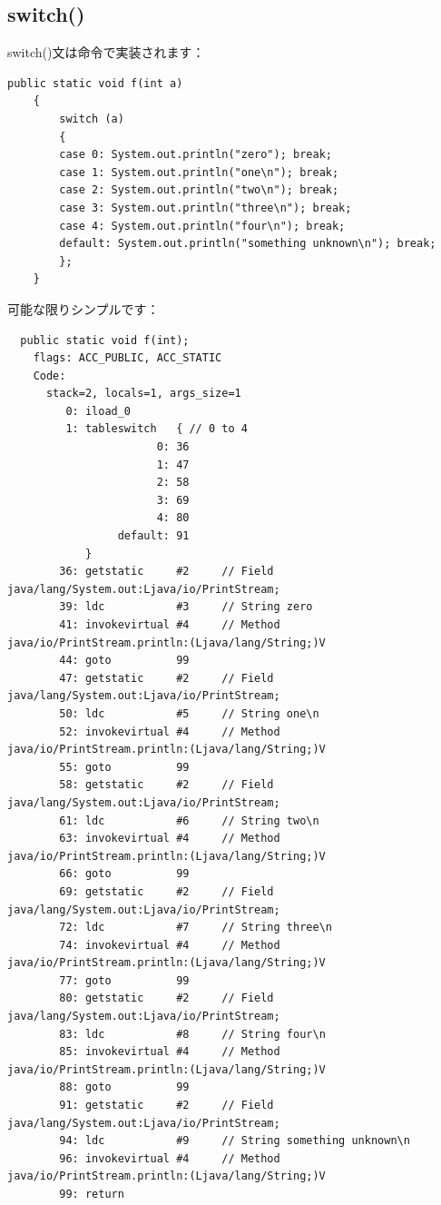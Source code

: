 \subsection{switch()}

switch()文は命令で実装されます：

\begin{lstlisting}[style=customjava]
	public static void f(int a)
	{
		switch (a)
		{
		case 0: System.out.println("zero"); break;
		case 1: System.out.println("one\n"); break;
		case 2: System.out.println("two\n"); break;
		case 3: System.out.println("three\n"); break;
		case 4: System.out.println("four\n"); break;
		default: System.out.println("something unknown\n"); break;
		};
	}
\end{lstlisting}

可能な限りシンプルです：

\begin{lstlisting}
  public static void f(int);
    flags: ACC_PUBLIC, ACC_STATIC
    Code:
      stack=2, locals=1, args_size=1
         0: iload_0       
         1: tableswitch   { // 0 to 4
                       0: 36
                       1: 47
                       2: 58
                       3: 69
                       4: 80
                 default: 91
            }
        36: getstatic     #2     // Field java/lang/System.out:Ljava/io/PrintStream;
        39: ldc           #3     // String zero
        41: invokevirtual #4     // Method java/io/PrintStream.println:(Ljava/lang/String;)V
        44: goto          99
        47: getstatic     #2     // Field java/lang/System.out:Ljava/io/PrintStream;
        50: ldc           #5     // String one\n
        52: invokevirtual #4     // Method java/io/PrintStream.println:(Ljava/lang/String;)V
        55: goto          99
        58: getstatic     #2     // Field java/lang/System.out:Ljava/io/PrintStream;
        61: ldc           #6     // String two\n
        63: invokevirtual #4     // Method java/io/PrintStream.println:(Ljava/lang/String;)V
        66: goto          99
        69: getstatic     #2     // Field java/lang/System.out:Ljava/io/PrintStream;
        72: ldc           #7     // String three\n
        74: invokevirtual #4     // Method java/io/PrintStream.println:(Ljava/lang/String;)V
        77: goto          99
        80: getstatic     #2     // Field java/lang/System.out:Ljava/io/PrintStream;
        83: ldc           #8     // String four\n
        85: invokevirtual #4     // Method java/io/PrintStream.println:(Ljava/lang/String;)V
        88: goto          99
        91: getstatic     #2     // Field java/lang/System.out:Ljava/io/PrintStream;
        94: ldc           #9     // String something unknown\n
        96: invokevirtual #4     // Method java/io/PrintStream.println:(Ljava/lang/String;)V
        99: return        
\end{lstlisting}